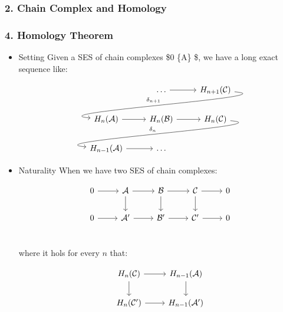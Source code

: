 \documentclass[11pt]{article}
\begin{document}
\subsubsection*{2. Chain Complex and Homology}
\label{sec-3-2-1}
\subsubsection*{4. Homology Theorem}
\label{sec-3-2-2}
\begin{itemize}
\item Setting
\label{sec-3-2-2-1}
Given a SES of chain complexes \$0 \longrightarrow \{\cal A\}
\$, we have a long exact
sequence like:

\[ \begin{tikzcd}
 & \dots\rar & H_{n+1}({\cal C}) \arrow[out=355,in=175,swap]{dll}{\delta_{n+1}} \\
H_{n}({\cal A})\rar & H_{n}({\cal B}) \rar & H_{n}({\cal C}) \arrow[out=355,in=175,swap]{dll}{\delta_n}\\
H_{n-1}({\cal A})\rar & \dots & 
\end{tikzcd} \]

\item Naturality
\label{sec-3-2-2-2}
When we have two SES of chain complexes:

\[ \begin{tikzcd}
0 \rar & {\cal A}\rar\dar & {\cal B}\rar\dar & {\cal C}\rar\dar & 0 \\
0 \rar & {\cal A}'\rar & {\cal B}'\rar & {\cal C}'\rar & 0 \\
\end{tikzcd} \]

where it hols for every $n$ that:

\[ \begin{tikzcd}
H_n({\cal C}) \rar\dar & H_{n-1}({\cal A})\dar \\
H_n({\cal C}') \rar & H_{n-1}({\cal A}')
\end{tikzcd} \]
\end{itemize}
\end{document}
